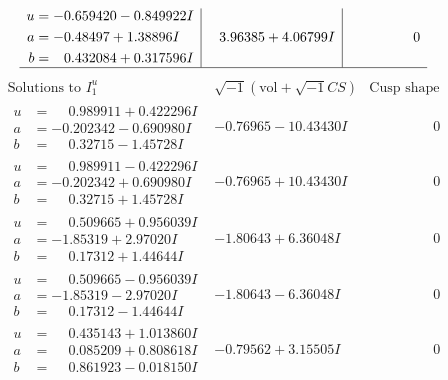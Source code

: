 \documentclass[1p]{elsarticle_modified}
\theoremstyle{definition}
\newcommand{\I}{\sqrt{-1}}
\begin{document}
$$\begin{array}{c|c|c}
\begin{aligned}
u &= -0.659420 - 0.849922 I \\
a &= -0.48497 + 1.38896 I \\
b &= \phantom{-}0.432084 + 0.317596 I\end{aligned}
 & \phantom{-}3.96385 + 4.06799 I & \phantom{-0.000000 } 0\\
 \hline 
 \end{array}$$\newpage$$\begin{array}{c|c|c}  
\text{Solutions to }I^u_{1}& \I (\text{vol} + \sqrt{-1}CS) & \text{Cusp shape}\\
 \hline 
\begin{aligned}
u &= \phantom{-}0.989911 + 0.422296 I \\
a &= -0.202342 - 0.690980 I \\
b &= \phantom{-}0.32715 - 1.45728 I\end{aligned}
 & -0.76965 - 10.43430 I & \phantom{-0.000000 } 0 \\ \hline\begin{aligned}
u &= \phantom{-}0.989911 - 0.422296 I \\
a &= -0.202342 + 0.690980 I \\
b &= \phantom{-}0.32715 + 1.45728 I\end{aligned}
 & -0.76965 + 10.43430 I & \phantom{-0.000000 } 0 \\ \hline\begin{aligned}
u &= \phantom{-}0.509665 + 0.956039 I \\
a &= -1.85319 + 2.97020 I \\
b &= \phantom{-}0.17312 + 1.44644 I\end{aligned}
 & -1.80643 + 6.36048 I & \phantom{-0.000000 } 0 \\ \hline\begin{aligned}
u &= \phantom{-}0.509665 - 0.956039 I \\
a &= -1.85319 - 2.97020 I \\
b &= \phantom{-}0.17312 - 1.44644 I\end{aligned}
 & -1.80643 - 6.36048 I & \phantom{-0.000000 } 0 \\ \hline\begin{aligned}
u &= \phantom{-}0.435143 + 1.013860 I \\
a &= \phantom{-}0.085209 + 0.808618 I \\
b &= \phantom{-}0.861923 - 0.018150 I\end{aligned}
 & -0.79562 + 3.15505 I & \phantom{-0.000000 } 0 \\ \hline\begin{aligned}

\end{aligned}
\end{array}$$
\end{document}
